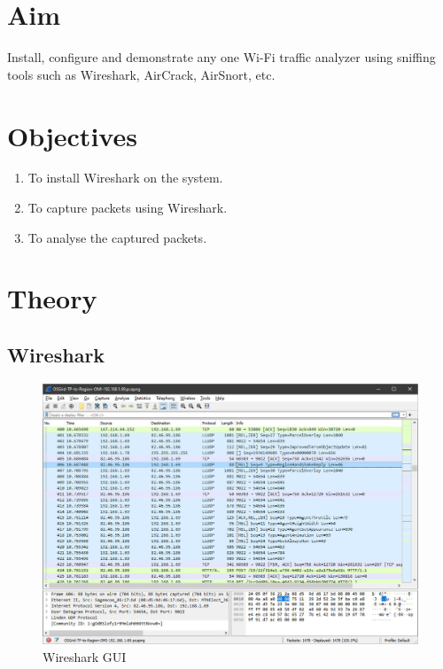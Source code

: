 \documentclass[11pt]{article}
\begin{document}
\tableofcontents
\thispagestyle{empty}
\clearpage

\setcounter{page}{1}

\section{Aim}
Install, configure and demonstrate any one Wi-Fi traffic analyzer using
sniffing tools such as Wireshark, AirCrack, AirSnort, etc.

\section{Objectives}
\begin{enumerate}
	\item To install Wireshark on the system.
	\item To capture packets using Wireshark.
	\item To analyse the captured packets.
\end{enumerate}

\section{Theory}

\subsection{Wireshark}

\begin{figure}[H]
	\centering
	\includegraphics[width=.95\textwidth]{wireshark/wireshark_4.jpg}
	\caption{Wireshark GUI}
\end{figure}
\end{document}

